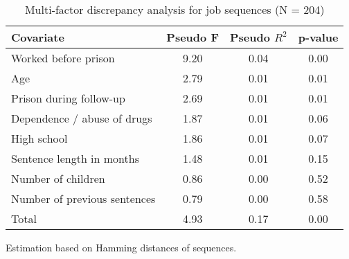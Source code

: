 \begin{table}[htp]
\footnotesize
\setlength{\tabcolsep}{10pt}
\renewcommand{\arraystretch}{1.3}
\begin{threeparttable}
\centering
\caption{Multi-factor discrepancy analysis for job sequences (N = 204)} 
\label{tab:discrepancy_job}
\begin{tabular}{lccc}
  \hline
Covariate & Pseudo F & Pseudo $R^2$ & p-value \\ 
  \hline
Worked before prison & 9.20 & 0.04 & 0.00 \\ 
  Age & 2.79 & 0.01 & 0.01 \\ 
  Prison during follow-up & 2.69 & 0.01 & 0.01 \\ 
  Dependence / abuse of drugs & 1.87 & 0.01 & 0.06 \\ 
  High school & 1.86 & 0.01 & 0.07 \\ 
  Sentence length in months & 1.48 & 0.01 & 0.15 \\ 
  Number of children & 0.86 & 0.00 & 0.52 \\ 
  Number of previous sentences & 0.79 & 0.00 & 0.58 \\ 
  Total & 4.93 & 0.17 & 0.00 \\ 
   \hline
\end{tabular}
\begin{tablenotes}
\scriptsize
\item Estimation based on Hamming distances of sequences.
\end{tablenotes}
\end{threeparttable}
\end{table}
